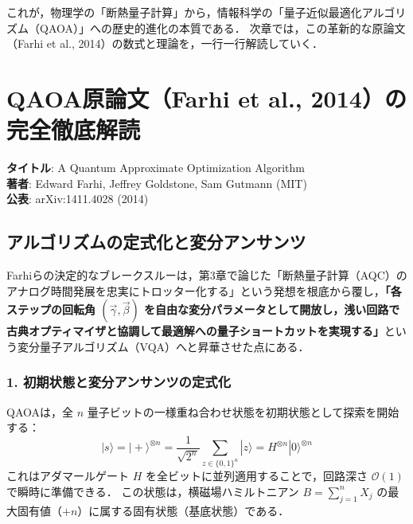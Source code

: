 \documentclass[11pt,a4paper,oneside,openany]{ltjsbook}
\theoremstyle{definition}
\theoremstyle{plain}
\theoremstyle{remark}
\newcommand{\ket}[1]{|#1\rangle}
\begin{document}
これが，物理学の「断熱量子計算」から，情報科学の「量子近似最適化アルゴリズム（QAOA）」への歴史的進化の本質である．
次章では，この革新的な原論文（Farhi et al., 2014）の数式と理論を，一行一行解読していく．

\chapter{QAOA原論文（Farhi et al., 2014）の完全徹底解読}

\begin{paperbox}[原著論文データ]
\textbf{タイトル}: A Quantum Approximate Optimization Algorithm\\
\textbf{著者}: Edward Farhi, Jeffrey Goldstone, Sam Gutmann (MIT)\\
\textbf{公表}: arXiv:1411.4028 (2014)
\end{paperbox}

\section{アルゴリズムの定式化と変分アンサンツ}
Farhiらの決定的なブレークスルー\cite{farhi2014quantum}は，第3章で論じた「断熱量子計算（AQC）のアナログ時間発展を忠実にトロッター化する」という発想を根底から覆し，\textbf{「各ステップの回転角 $(\vec{\gamma}, \vec{\beta})$ を自由な変分パラメータとして開放し，浅い回路で古典オプティマイザと協調して最適解への量子ショートカットを実現する」}という変分量子アルゴリズム（VQA\cite{cerezo2021variational}）へと昇華させた点にある．

\subsection{1. 初期状態と変分アンサンツの定式化}
QAOAは，全 $n$ 量子ビットの一様重ね合わせ状態を初期状態として探索を開始する：
\begin{equation}
    \ket{s} = \ket{+}^{\otimes n} = \frac{1}{\sqrt{2^n}} \sum_{z \in \{0, 1\}^n} \ket{z} = H^{\otimes n} \ket{0}^{\otimes n}
\end{equation}
これはアダマールゲート $H$ を全ビットに並列適用することで，回路深さ $\mathcal{O}(1)$ で瞬時に準備できる．
この状態は，横磁場ハミルトニアン $B = \sum_{j=1}^n X_j$ の最大固有値（$+n$）に属する固有状態（基底状態）である．
\end{document}
